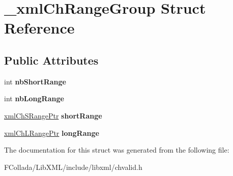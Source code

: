 \hypertarget{struct__xmlChRangeGroup}{
\section{\_\-xmlChRangeGroup Struct Reference}
\label{struct__xmlChRangeGroup}
}
\subsection*{Public Attributes}
\begin{DoxyCompactItemize}
\item 
\hypertarget{struct__xmlChRangeGroup_a586ec6ff0df5781a799120268c917581}{
int {\bfseries nbShortRange}}
\label{struct__xmlChRangeGroup_a586ec6ff0df5781a799120268c917581}

\item 
\hypertarget{struct__xmlChRangeGroup_a8c00ae5937f0d5489444fd8c264f7640}{
int {\bfseries nbLongRange}}
\label{struct__xmlChRangeGroup_a8c00ae5937f0d5489444fd8c264f7640}

\item 
\hypertarget{struct__xmlChRangeGroup_a34fbee3ee26baf6b51c6089b8ca51214}{
\hyperlink{struct__xmlChSRange}{xmlChSRangePtr} {\bfseries shortRange}}
\label{struct__xmlChRangeGroup_a34fbee3ee26baf6b51c6089b8ca51214}

\item 
\hypertarget{struct__xmlChRangeGroup_ab8b79a7142c4ed04f10d5dae1e970848}{
\hyperlink{struct__xmlChLRange}{xmlChLRangePtr} {\bfseries longRange}}
\label{struct__xmlChRangeGroup_ab8b79a7142c4ed04f10d5dae1e970848}

\end{DoxyCompactItemize}


The documentation for this struct was generated from the following file:\begin{DoxyCompactItemize}
\item 
FCollada/LibXML/include/libxml/chvalid.h\end{DoxyCompactItemize}
